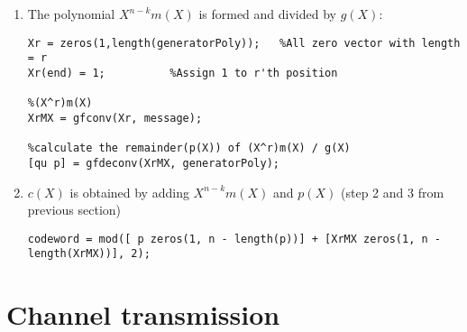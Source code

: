 \documentclass[Main]{subfiles}
\begin{document}
\begin{enumerate}
\item The polynomial $X^{n-k}m(X)$ is formed and divided by $g(X)$:
\begin{lstlisting}[label={lst:obtainP},captionpos=b, caption=Obtaining $p(X)$ as the remainder of $X^rm(X) / g(X)$.] 
%creating X^(n-k) = X^r
Xr = zeros(1,length(generatorPoly));   %All zero vector with length = r
Xr(end) = 1;          %Assign 1 to r'th position

%(X^r)m(X)
XrMX = gfconv(Xr, message);

%calculate the remainder(p(X)) of (X^r)m(X) / g(X) 
[qu p] = gfdeconv(XrMX, generatorPoly);
\end{lstlisting}

\item $c(X)$ is obtained by adding  $X^{n-k}m(X)$ and $p(X)$ (step 2 and 3 from previous section)

\begin{lstlisting}[label={lst:obtainC},captionpos=b, caption=Obtaining $c(X)$ by adding $X^{n-k}m(X)$ and $p(X)$.]
codeword = mod([ p zeros(1, n - length(p))] + [XrMX zeros(1, n - length(XrMX))], 2);
\end{lstlisting}
\end{enumerate}



\section{Channel transmission}
\end{document}

